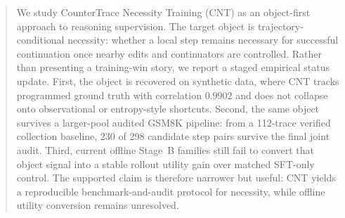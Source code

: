 \begin{abstract}
We study CounterTrace Necessity Training (CNT) as an object-first approach to reasoning supervision. The target object is trajectory-conditional necessity: whether a local step remains necessary for successful continuation once nearby edits and continuators are controlled. Rather than presenting a training-win story, we report a staged empirical status update. First, the object is recovered on synthetic data, where CNT tracks programmed ground truth with correlation $0.9902$ and does not collapse onto observational or entropy-style shortcuts. Second, the same object survives a larger-pool audited GSM8K pipeline: from a 112-trace verified collection baseline, 230 of 298 candidate step pairs survive the final joint audit. Third, current offline Stage~B families still fail to convert that object signal into a stable rollout utility gain over matched SFT-only control. The supported claim is therefore narrower but useful: CNT yields a reproducible benchmark-and-audit protocol for necessity, while offline utility conversion remains unresolved.
\end{abstract}
